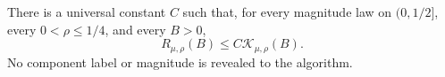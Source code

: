\begin{theorem}\label{thm:three-piece-upper}
There is a universal constant $C$ such that, for every magnitude law on
$(0,1/2]$, every $0<\rho\le1/4$, and every $B>0$,
\begin{equation}\label{eq:three-piece-upper}
 R_{\mu,\rho}(B)\le C\mathcal K_{\mu,\rho}(B).
\end{equation}
No component label or magnitude is revealed to the algorithm.
\end{theorem}
